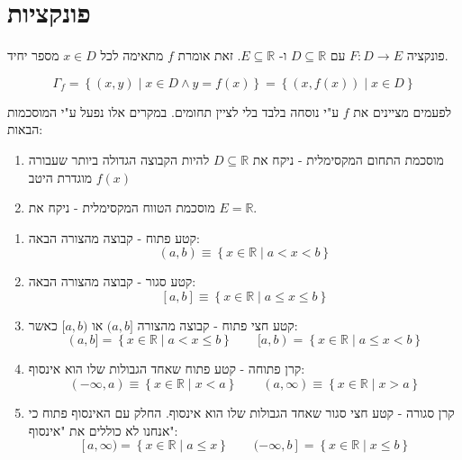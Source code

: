 \documentclass{tstextbook}
\begin{document}
\section{פונקציות}

\begin{definition}
פונקציה \(F:D\to E\) עם \(D\subseteq \mathbb{R}\) ו- \(E\subseteq \mathbb{R}\). זאת אומרת \(f\) מתאימה לכל \(x \in D\) מספר יחיד.

\end{definition}
\begin{definition}
$$\Gamma_{f}=\left\{  (x,y)\mid x \in D\land y=f(x)  \right\}=\left\{  (x,f(x))\mid x \in D  \right\}$$

\end{definition}
\begin{remark}
לפעמים מציינים את \(f\) ע"י נוסחה בלבד בלי לציין תחומים. במקרים אלו נפעל ע"י המוסכמות הבאות:

  \begin{enumerate}
    \item מוסכמת התחום המקסימלית - ניקח את \(D\subseteq \mathbb{R}\) להיות הקבוצה הגדולה ביותר שעבורה \(f(x)\) מוגדרת היטב 


    \item מוסכמת הטווח המקסימלית - ניקח את \(E=\mathbb{R}\). 


  \end{enumerate}
\end{remark}
\begin{definition}
  \begin{enumerate}
    \item קטע פתוח - קבוצה מהצורה הבאה: 
$$(a,b)\equiv\left\{  x \in \mathbb{R}\mid a<x<b  \right\}$$


    \item קטע סגור - קבוצה מהצורה הבאה: 
$$[a,b]\equiv \left\{  x \in \mathbb{R}  \mid a\leq x \leq b\right\}$$


    \item קטע חצי פתוח - קבוצה מהצורה \((a,b]\) או \([a,b)\) כאשר: 
$$\left( a,b]=\left\{  x \in \mathbb{R}\mid a<x\leq b  \right\}\qquad [a,b \right)=\left\{  x \in \mathbb{R}\mid a\leq x< b  \right\}$$


    \item קרן פתוחה - קטע פתוח שאחד הגבולות שלו הוא אינסוף: 
$$\left( -\infty,a \right)\equiv \left\{  x \in \mathbb{R} \mid x< a \right\}\qquad \left( a,\infty \right)\equiv\left\{  x \in \mathbb{R}\mid x> a  \right\}$$


    \item קרן סגורה - קטע חצי סגור שאחד הגבולות שלו הוא אינסוף. החלק עם האינסוף פתוח כי אנחנו לא כוללים את "אינסוף": 
$$\left[ a,\infty)=\left\{ x \in \mathbb{R}\mid a\leq x   \right\}\qquad (-\infty,b \right]=\left\{  x \in \mathbb{R}\mid x\leq b  \right\}$$


  \end{enumerate}
\end{definition}
\end{document}
